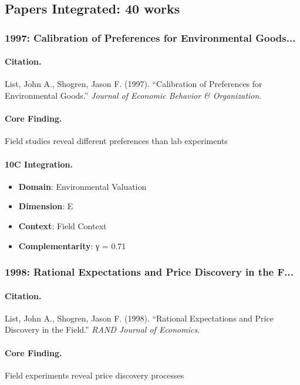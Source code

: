 \subsection{Papers Integrated: 40 works}


\subsubsection{1997: Calibration of Preferences for Environmental Goods...}

\paragraph{Citation.}
List, John A., Shogren, Jason F. (1997). ``Calibration of Preferences for Environmental Goods.''
\textit{Journal of Economic Behavior & Organization}.

\paragraph{Core Finding.}
Field studies reveal different preferences than lab experiments

\paragraph{10C Integration.}
\begin{itemize}[nosep]
  \item \textbf{Domain}: Environmental Valuation
  \item \textbf{Dimension}: E
  \item \textbf{Context}: Field Context
  \item \textbf{Complementarity}: γ = 0.71
\end{itemize}


\subsubsection{1998: Rational Expectations and Price Discovery in the F...}

\paragraph{Citation.}
List, John A., Shogren, Jason F. (1998). ``Rational Expectations and Price Discovery in the Field.''
\textit{RAND Journal of Economics}.

\paragraph{Core Finding.}
Field experiments reveal price discovery processes


